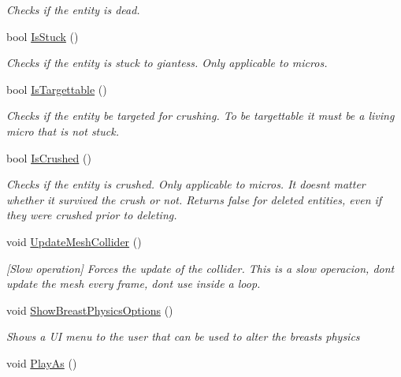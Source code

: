 \begin{DoxyCompactItemize}
\begin{DoxyCompactList}\small\item\em Checks if the entity is dead. \end{DoxyCompactList}\item 
bool \mbox{\hyperlink{class_lua_1_1_entity_ab25d357d357ab0cf7ff9a2e81aa9cb08}{Is\+Stuck}} ()
\begin{DoxyCompactList}\small\item\em Checks if the entity is stuck to giantess. Only applicable to micros. \end{DoxyCompactList}\item 
bool \mbox{\hyperlink{class_lua_1_1_entity_aa8688dacb32db168b780597d8f11622b}{Is\+Targettable}} ()
\begin{DoxyCompactList}\small\item\em Checks if the entity be targeted for crushing. To be targettable it must be a living micro that is not stuck. \end{DoxyCompactList}\item 
bool \mbox{\hyperlink{class_lua_1_1_entity_a4b4bb9870796b854c0d5666c9cba9375}{Is\+Crushed}} ()
\begin{DoxyCompactList}\small\item\em Checks if the entity is crushed. Only applicable to micros. It doesn\textquotesingle{}t matter whether it survived the crush or not. Returns false for deleted entities, even if they were crushed prior to deleting. \end{DoxyCompactList}\item 
void \mbox{\hyperlink{class_lua_1_1_entity_a6be24874965a4015e7fd8244fa345220}{Update\+Mesh\+Collider}} ()
\begin{DoxyCompactList}\small\item\em \mbox{[}Slow operation\mbox{]} Forces the update of the collider. This is a slow operacion, don\textquotesingle{}t update the mesh every frame, don\textquotesingle{}t use inside a loop. \end{DoxyCompactList}\item 
void \mbox{\hyperlink{class_lua_1_1_entity_ac2bbfd97ccf17d7cd96fb1cf3b3c51e4}{Show\+Breast\+Physics\+Options}} ()
\begin{DoxyCompactList}\small\item\em Shows a UI menu to the user that can be used to alter the breasts physics \end{DoxyCompactList}\item 
void \mbox{\hyperlink{class_lua_1_1_entity_aa3ec8ca2693205f43b8e1e620b209018}{Play\+As}} ()

\end{DoxyCompactItemize}
